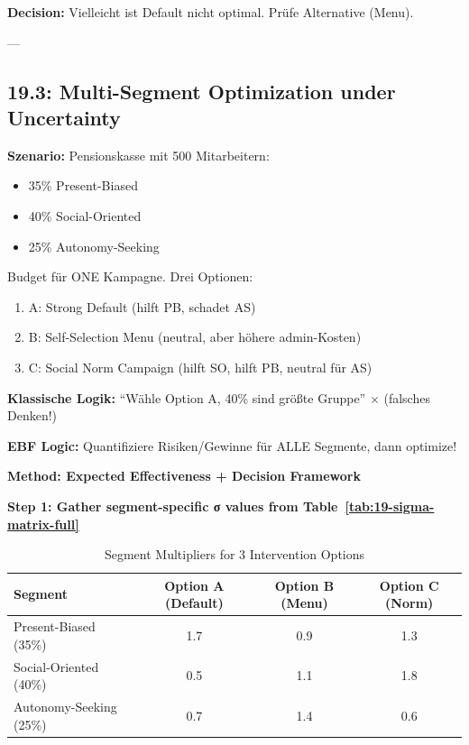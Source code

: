 \textbf{Decision:} Vielleicht ist Default nicht optimal. Prüfe Alternative (Menu).

---

\subsection{19.3: Multi-Segment Optimization under Uncertainty}
\label{subsec:19-llmmc-optimization}

\begin{tcolorbox}[colback=red!5!white, colframe=red!75!black, title=\textbf{Problem: Multi-Segment Portfolio Design}]

\textbf{Szenario:} Pensionskasse mit 500 Mitarbeitern:
\begin{itemize}[nosep]
\item 35\% Present-Biased
\item 40\% Social-Oriented
\item 25\% Autonomy-Seeking
\end{itemize}

Budget für ONE Kampagne. Drei Optionen:
\begin{enumerate}
\item A: Strong Default (hilft PB, schadet AS)
\item B: Self-Selection Menu (neutral, aber höhere admin-Kosten)
\item C: Social Norm Campaign (hilft SO, hilft PB, neutral für AS)
\end{enumerate}

\textbf{Klassische Logik:} ``Wähle Option A, 40\% sind größte Gruppe'' $\times$ (falsches Denken!)

\textbf{EBF Logic:} Quantifiziere Risiken/Gewinne für ALLE Segmente, dann optimize!

\end{tcolorbox}

\textbf{Method: Expected Effectiveness + Decision Framework}

\textbf{Step 1: Gather segment-specific σ values from Table~\ref{tab:19-sigma-matrix-full}}

\begin{table}[htbp]
\centering
\caption{Segment Multipliers for 3 Intervention Options}
\label{tab:19-multi-segment-options}
\renewcommand{\arraystretch}{1.3}
\small
\begin{tabular}{@{}lccc@{}}
\toprule
\textbf{Segment} & \textbf{Option A (Default)} & \textbf{Option B (Menu)} & \textbf{Option C (Norm)} \\
\midrule
Present-Biased (35\%) & 1.7 & 0.9 & 1.3 \\
Social-Oriented (40\%) & 0.5 & 1.1 & 1.8 \\
Autonomy-Seeking (25\%) & 0.7 & 1.4 & 0.6 \\
\bottomrule
\end{tabular}
\end{table}

